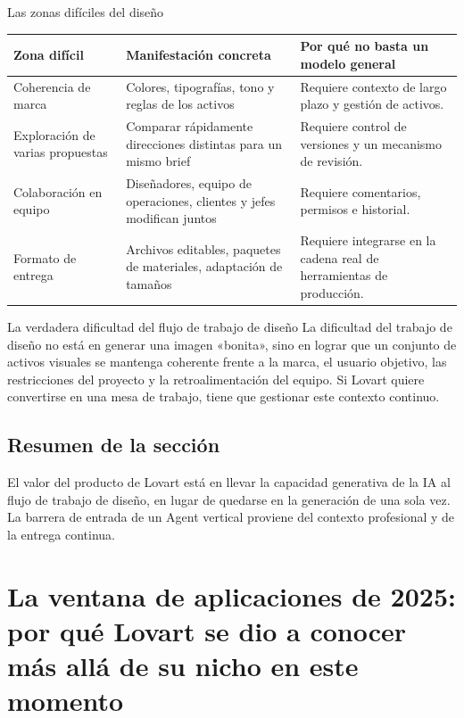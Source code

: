 \documentclass[a4paper]{article}
\begin{document}
\begin{knowledgebox}{Las zonas difíciles del diseño}
\begin{tabularx}{\textwidth}{p{}p{}X}
\toprule
Zona difícil & Manifestación concreta & Por qué no basta un modelo general \\
\midrule
Coherencia de marca & Colores, tipografías, tono y reglas de los activos & Requiere contexto de largo plazo y gestión de activos. \\
Exploración de varias propuestas & Comparar rápidamente direcciones distintas para un mismo brief & Requiere control de versiones y un mecanismo de revisión. \\
Colaboración en equipo & Diseñadores, equipo de operaciones, clientes y jefes modifican juntos & Requiere comentarios, permisos e historial. \\
Formato de entrega & Archivos editables, paquetes de materiales, adaptación de tamaños & Requiere integrarse en la cadena real de herramientas de producción. \\
\bottomrule
\end{tabularx}
\end{knowledgebox}

\begin{importantbox}{La verdadera dificultad del flujo de trabajo de diseño}
La dificultad del trabajo de diseño no está en generar una imagen «bonita», sino en lograr que un conjunto de activos visuales se mantenga coherente frente a la marca, el usuario objetivo, las restricciones del proyecto y la retroalimentación del equipo. Si Lovart quiere convertirse en una mesa de trabajo, tiene que gestionar este contexto continuo.
\end{importantbox}

\subsection{Resumen de la sección}

El valor del producto de Lovart está en llevar la capacidad generativa de la IA al flujo de trabajo de diseño, en lugar de quedarse en la generación de una sola vez. La barrera de entrada de un Agent vertical proviene del contexto profesional y de la entrega continua.
\section{La ventana de aplicaciones de 2025: por qué Lovart se dio a conocer más allá de su nicho en este momento}
\end{document}
